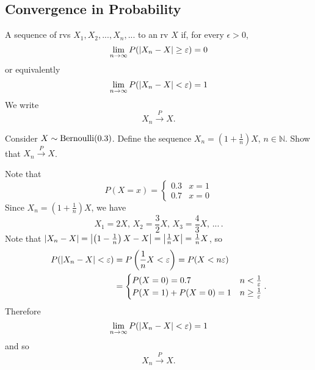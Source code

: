 \documentclass[notoc,notitlepage]{tufte-book}
\newcommand{\convp}{\overset{P}{\to}}
\begin{document}
\subsection{Convergence in Probability}%
\label{sub:convergence_in_probability}

\begin{defn}
\label{defn:convergence_in_probability}
  A sequence of rvs $X_1, X_2,..., X_n, ...$  to an rv $X$ if, for every $\epsilon > 0$,
  \begin{equation*}
    \lim_{n \to \infty} P ( \left|X_n - X\right| \geq \varepsilon ) = 0
  \end{equation*}
  or equivalently
  \begin{equation*}
    \lim_{n \to \infty} P(\left|X_n - X\right| < \varepsilon) = 1
  \end{equation*}
  We write
  \begin{equation*}
    X_n \convp X.
  \end{equation*}
\end{defn}

\begin{eg}[Example 5.3]
  Consider $X \sim \operatorname{Bernoulli}(0.3)$. Define the sequence $X_n = \left(1 + \frac{1}{n}\right) X$, $n \in \mathbb{N}$. Show that $X_n \convp X$.
\end{eg}

\begin{solution}
  Note that
  \begin{equation*}
    P(X = x) = \begin{cases}
      0.3 & x = 1 \\
      0.7 & x = 0
    \end{cases}
  \end{equation*}
  Since $X_n = \left(1 + \frac{1}{n}\right) X$, we have
  \begin{equation*}
    X_1 = 2X, \, X_2 = \frac{3}{2} X, \, X_3 = \frac{4}{3} X, \, ... \,.
  \end{equation*}
  Note that $\left|X_n - X\right| = \left|\left(1 - \frac{1}{n}\right) X - X\right| = \left|\frac{1}{n}X\right| = \frac{1}{n} X$, so
  \begin{align*}
    P(\left|X_n - X\right| < \varepsilon) &= P \left( \frac{1}{n} X < \varepsilon \right) = P( X < n \varepsilon ) \\
                                &= \begin{cases}
    P( X = 0 ) = 0.7 & n < \frac{1}{\varepsilon} \\
    P( X = 1 ) + P( X = 0 ) = 1 & n \geq \frac{1}{\varepsilon}
                                \end{cases}.
  \end{align*}
  Therefore
  \begin{equation*}
    \lim_{n \to \infty} P( \left|X_n - X\right| < \varepsilon ) = 1
  \end{equation*}
  and so
  \begin{equation*}
    X_n \convp X.
  \end{equation*}
\end{solution}
\end{document}

